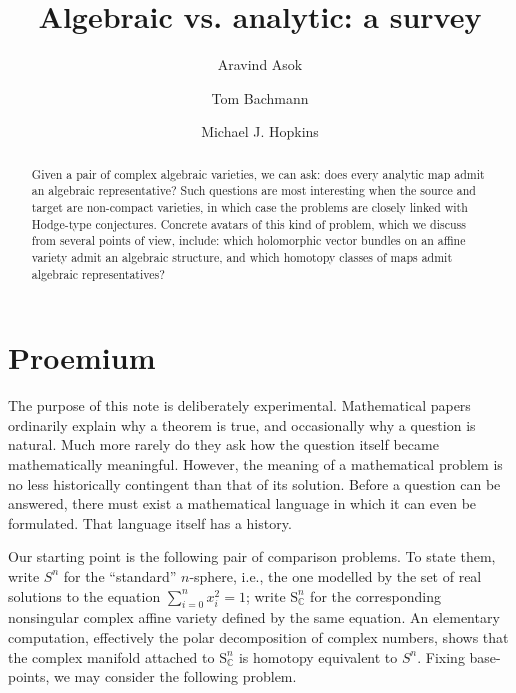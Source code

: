 \documentclass[11pt,leqno]{article}
\newcommand{\cplx}{{\mathbb C}}
\renewcommand{\1}{{\rm 1\hspace*{-0.4ex}%
\rule{0.1ex}{1.52ex}\hspace*{0.2ex}}}
\newcommand{\<}[1]{{\langle}#1 {\rangle}}
\theoremstyle{plain}
\theoremstyle{definition}
\theoremstyle{remark}
\numberwithin{equation}{subsection}
\begin{document}
\pagestyle{fancy}
\renewcommand{\sectionmark}[1]{\markright{\thesection\ #1}}
\fancyhead{}
\fancyhead[LO,R]{\bfseries\footnotesize\thepage}
\fancyhead[LE]{\bfseries\footnotesize\rightmark}
\fancyhead[RO]{\bfseries\footnotesize\rightmark}
\chead[]{}
\cfoot[]{}
\setlength{\headheight}{1cm}



\author{Aravind Asok \and Tom Bachmann \and Michael J. Hopkins}


\title{{\bf Algebraic vs. analytic: a survey}}
\date{}
\maketitle

\begin{abstract}
	Given a pair of complex algebraic varieties, we can ask: does every analytic map admit an algebraic representative?  Such questions are most interesting when the source and target are non-compact varieties, in which case the problems are closely linked with Hodge-type conjectures.  Concrete avatars of this kind of problem, which we discuss from several points of view, include: which holomorphic vector bundles on an affine variety admit an algebraic structure, and which homotopy classes of maps admit algebraic representatives?  
\end{abstract}

\begin{footnotesize}
\tableofcontents
\end{footnotesize}

\section*{Proemium}
The purpose of this note is deliberately experimental. Mathematical papers ordinarily explain why a theorem is true, and occasionally why a question is natural. Much more rarely do they ask how the question itself became mathematically meaningful. However, the meaning of a mathematical problem is no less historically contingent than that of its solution.  Before a question can be answered, there must exist a mathematical language in which it can even be formulated. That language itself has a history.

Our starting point is the following pair of comparison problems.  To state them, write $S^{n}$ for the ``standard'' $n$-sphere, i.e., the one modelled by the set of real solutions to the equation $\sum_{i=0}^n x_i^2 = 1$; write $\mathrm{S}^{n}_{\cplx}$ for the corresponding nonsingular complex affine variety defined by the same equation.  An elementary computation,  effectively the polar decomposition of complex numbers, shows that the complex manifold attached to $\mathrm{S}^{n}_{\cplx}$ is homotopy equivalent to $S^n$.  Fixing base-points, we may consider the following problem.
\end{document}
